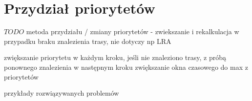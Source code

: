 \section{Przydział priorytetów}
$TODO$ metoda przydziału / zmiany priorytetów - zwiekszanie i rekalkulacja w przypadku braku znalezienia trasy, nie dotyczy np LRA

zwiększanie priorytetu w każdym kroku, jeśli nie znaleziono trasy, z próbą ponownego znalezienia w następnym kroku
zwiększanie okna czasowego do max z priorytetów

przykłady rozwiązywanych problemów